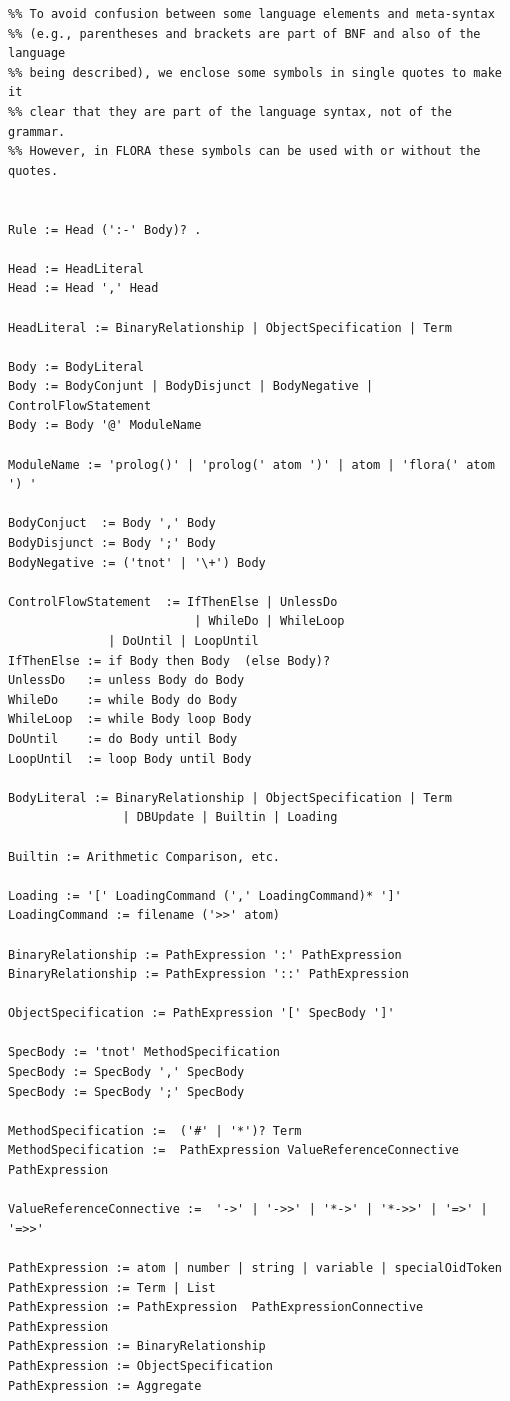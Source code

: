 \documentclass[11pt]{article}
\begin{document}
\begin{verbatim}
%% To avoid confusion between some language elements and meta-syntax
%% (e.g., parentheses and brackets are part of BNF and also of the language
%% being described), we enclose some symbols in single quotes to make it
%% clear that they are part of the language syntax, not of the grammar.
%% However, in FLORA these symbols can be used with or without the quotes.


Rule := Head (':-' Body)? .

Head := HeadLiteral
Head := Head ',' Head

HeadLiteral := BinaryRelationship | ObjectSpecification | Term

Body := BodyLiteral
Body := BodyConjunt | BodyDisjunct | BodyNegative | ControlFlowStatement
Body := Body '@' ModuleName

ModuleName := 'prolog()' | 'prolog(' atom ')' | atom | 'flora(' atom ') '

BodyConjuct  := Body ',' Body
BodyDisjunct := Body ';' Body
BodyNegative := ('tnot' | '\+') Body

ControlFlowStatement  := IfThenElse | UnlessDo
                          | WhileDo | WhileLoop
			  | DoUntil | LoopUntil
IfThenElse := if Body then Body  (else Body)?
UnlessDo   := unless Body do Body
WhileDo    := while Body do Body
WhileLoop  := while Body loop Body
DoUntil    := do Body until Body
LoopUntil  := loop Body until Body

BodyLiteral := BinaryRelationship | ObjectSpecification | Term
                | DBUpdate | Builtin | Loading

Builtin := Arithmetic Comparison, etc.

Loading := '[' LoadingCommand (',' LoadingCommand)* ']'
LoadingCommand := filename ('>>' atom)

BinaryRelationship := PathExpression ':' PathExpression
BinaryRelationship := PathExpression '::' PathExpression

ObjectSpecification := PathExpression '[' SpecBody ']'

SpecBody := 'tnot' MethodSpecification
SpecBody := SpecBody ',' SpecBody
SpecBody := SpecBody ';' SpecBody

MethodSpecification :=  ('#' | '*')? Term
MethodSpecification :=  PathExpression ValueReferenceConnective PathExpression

ValueReferenceConnective :=  '->' | '->>' | '*->' | '*->>' | '=>' | '=>>'

PathExpression := atom | number | string | variable | specialOidToken
PathExpression := Term | List
PathExpression := PathExpression  PathExpressionConnective PathExpression
PathExpression := BinaryRelationship
PathExpression := ObjectSpecification
PathExpression := Aggregate


\end{verbatim}
\end{document}
